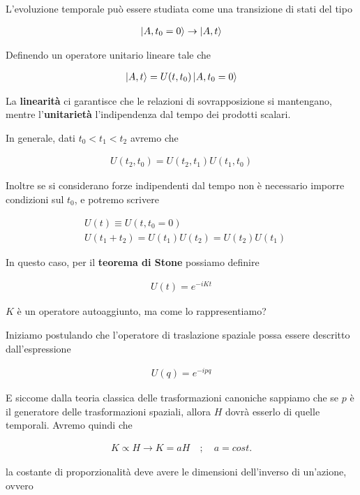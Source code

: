 L'evoluzione temporale può essere studiata come una transizione di stati del tipo

\begin{align}
\ket{A,t_0=0} \rightarrow \ket{A, t}
\end{align}

Definendo un operatore unitario lineare tale che

\begin{align}
\ket{A, t} = U(t,t_0)\ket{A, t_0=0}
\end{align}

La \textbf{linearità} ci garantisce che le relazioni di sovrapposizione si mantengano, mentre l'\textbf{unitarietà} l'indipendenza dal tempo dei prodotti scalari.

In generale, dati $t_0<t_1<t_2$ avremo che

\begin{align}
U(t_2,t_0)=U(t_2,t_1)U(t_1,t_0)
\end{align}

Inoltre se si considerano forze indipendenti dal tempo non è necessario imporre condizioni sul $t_0$, e potremo scrivere

\begin{align}
{}&U(t)\equiv U(t,t_0=0) \\
&U(t_{1}+t_{2})=U(t_{1}) U(t_{2})=U(t_{2}) U(t_{1}) 
\end{align}

In questo caso, per il \textbf{teorema di Stone} possiamo definire 

\begin{align}
U(t)= e^{-iKt}
\end{align}

$K$ è un operatore autoaggiunto, ma come lo rappresentiamo?

Iniziamo postulando che l'operatore di traslazione spaziale possa essere descritto dall'espressione

\begin{align}
U(q)= e^{-ipq}
\end{align}

E siccome dalla teoria classica delle trasformazioni canoniche sappiamo che se $p$ è il generatore delle trasformazioni spaziali, allora $H$ dovrà esserlo di quelle temporali. Avremo quindi che

\begin{align}
K \propto H \rightarrow K = aH \quad ; \quad a=cost. 
\end{align}

la costante di proporzionalità deve avere le dimensioni dell'inverso di un'azione, ovvero

